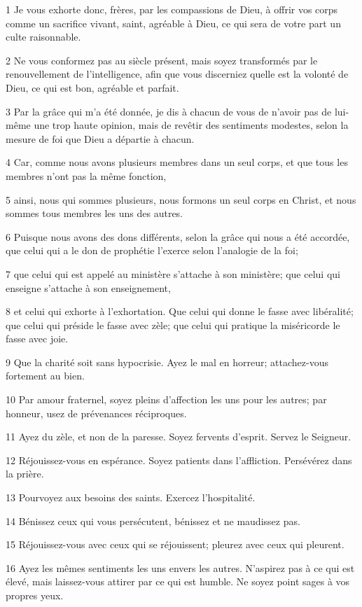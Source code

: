 \par 1 Je vous exhorte donc, frères, par les compassions de Dieu, à offrir vos corps comme un sacrifice vivant, saint, agréable à Dieu, ce qui sera de votre part un culte raisonnable.
\par 2 Ne vous conformez pas au siècle présent, mais soyez transformés par le renouvellement de l'intelligence, afin que vous discerniez quelle est la volonté de Dieu, ce qui est bon, agréable et parfait.
\par 3 Par la grâce qui m'a été donnée, je dis à chacun de vous de n'avoir pas de lui-même une trop haute opinion, mais de revêtir des sentiments modestes, selon la mesure de foi que Dieu a départie à chacun.
\par 4 Car, comme nous avons plusieurs membres dans un seul corps, et que tous les membres n'ont pas la même fonction,
\par 5 ainsi, nous qui sommes plusieurs, nous formons un seul corps en Christ, et nous sommes tous membres les uns des autres.
\par 6 Puisque nous avons des dons différents, selon la grâce qui nous a été accordée, que celui qui a le don de prophétie l'exerce selon l'analogie de la foi;
\par 7 que celui qui est appelé au ministère s'attache à son ministère; que celui qui enseigne s'attache à son enseignement,
\par 8 et celui qui exhorte à l'exhortation. Que celui qui donne le fasse avec libéralité; que celui qui préside le fasse avec zèle; que celui qui pratique la miséricorde le fasse avec joie.
\par 9 Que la charité soit sans hypocrisie. Ayez le mal en horreur; attachez-vous fortement au bien.
\par 10 Par amour fraternel, soyez pleins d'affection les uns pour les autres; par honneur, usez de prévenances réciproques.
\par 11 Ayez du zèle, et non de la paresse. Soyez fervents d'esprit. Servez le Seigneur.
\par 12 Réjouissez-vous en espérance. Soyez patients dans l'affliction. Persévérez dans la prière.
\par 13 Pourvoyez aux besoins des saints. Exercez l'hospitalité.
\par 14 Bénissez ceux qui vous persécutent, bénissez et ne maudissez pas.
\par 15 Réjouissez-vous avec ceux qui se réjouissent; pleurez avec ceux qui pleurent.
\par 16 Ayez les mêmes sentiments les uns envers les autres. N'aspirez pas à ce qui est élevé, mais laissez-vous attirer par ce qui est humble. Ne soyez point sages à vos propres yeux.
